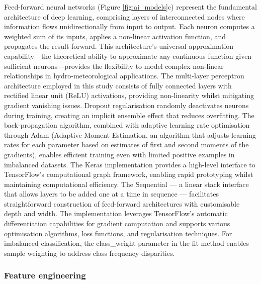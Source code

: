 Feed-forward  neural networks (Figure \ref{fig:ai_models}c) represent the fundamental architecture of deep learning, comprising layers of interconnected nodes where information flows unidirectionally from input to output. Each neuron computes a weighted sum of its inputs, applies a non-linear activation function, and propagates the result forward. This architecture's universal approximation capability—the theoretical ability to approximate any continuous function given sufficient neurons—provides the flexibility to model complex non-linear relationships in hydro-meteorological applications. The multi-layer perceptron architecture employed in this study consists of fully connected layers with rectified linear unit (ReLU) activations, providing non-linearity whilst mitigating gradient vanishing issues. Dropout regularisation randomly deactivates neurons during training, creating an implicit ensemble effect that reduces overfitting. The back-propagation algorithm, combined with adaptive learning rate optimisation through Adam (Adaptive Moment Estimation, an algorithm that adjusts learning rates for each parameter based on estimates of first and second moments of the gradients), enables efficient training even with limited positive examples in imbalanced datasets. The Keras implementation provides a high-level interface to TensorFlow's computational graph framework, enabling rapid prototyping whilst maintaining computational efficiency. The Sequential  — a linear stack interface that allows layers to be added one at a time in sequence — facilitates straightforward construction of feed-forward architectures with customisable depth and width. The implementation leverages TensorFlow's automatic differentiation capabilities for gradient computation and supports various optimisation algorithms, loss functions, and regularisation techniques. For imbalanced classification, the class\_weight parameter in the fit method enables sample weighting to address class frequency disparities.


\subsubsection{Feature engineering}

